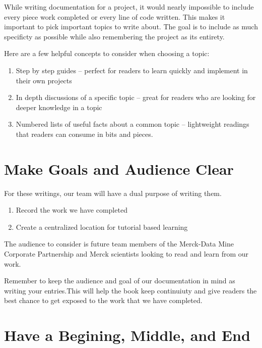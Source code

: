 \documentclass[]{book}
\begin{document}
While writing documentation for a project, it would nearly impossible to
include every piece work completed or every line of code written. This
makes it important to pick important topics to write about. The goal is
to include as much specificty as possible while also remembering the
project as its entirety.

Here are a few helpful concepts to consider when choosing a topic:

\begin{enumerate}
\def\labelenumi{\arabic{enumi}.}
\item
  Step by step guides -- perfect for readers to learn quickly and
  implement in their own projects
\item
  In depth discussions of a specific topic -- great for readers who are
  looking for deeper knowledge in a topic
\item
  Numbered lists of useful facts about a common topic -- lightweight
  readings that readers can consume in bits and pieces.
\end{enumerate}

\section{Make Goals and Audience
Clear}\label{make-goals-and-audience-clear}

For these writings, our team will have a dual purpose of writing them.

\begin{enumerate}
\def\labelenumi{\arabic{enumi}.}
\item
  Record the work we have completed
\item
  Create a centralized location for tutorial based learning
\end{enumerate}

The audience to consider is future team members of the Merck-Data Mine
Corporate Partnership and Merck scientists looking to read and learn
from our work.

Remember to keep the audience and goal of our documentation in mind as
writing your entries.This will help the book keep continuiuty and give
readers the best chance to get exposed to the work that we have
completed.

\section{Have a Begining, Middle, and
End}\label{have-a-begining-middle-and-end}
\end{document}
